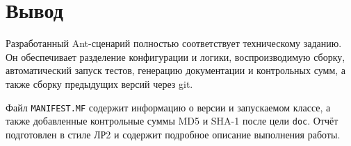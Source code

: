 \documentclass[12pt]{article}
\begin{document}


\section{Вывод}

Разработанный Ant-сценарий полностью соответствует техническому заданию. Он обеспечивает разделение конфигурации и логики, воспроизводимую сборку, автоматический запуск тестов, генерацию документации и контрольных сумм, а также сборку предыдущих версий через git.

Файл \texttt{MANIFEST.MF} содержит информацию о версии и запускаемом классе, а также добавленные контрольные суммы MD5 и SHA-1 после цели \texttt{doc}. Отчёт подготовлен в стиле ЛР2 и содержит подробное описание выполнения работы.
\end{document}
